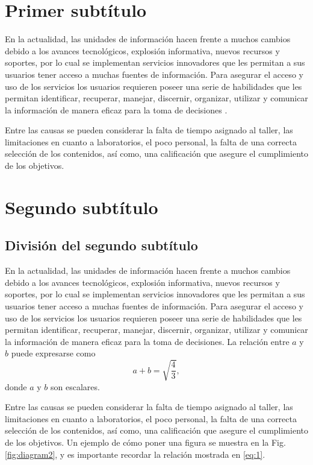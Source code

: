 \section{Primer subtítulo}

En la actualidad, las unidades de información hacen frente a muchos cambios
debido a los avances tecnológicos, explosión informativa, nuevos recursos y
soportes, por lo cual se implementan servicios innovadores que les permitan a
sus usuarios tener acceso a muchas fuentes de información. Para asegurar el
acceso y uso de los servicios los usuarios requieren poseer una serie de
habilidades que les permitan identificar, recuperar, manejar, discernir,
organizar, utilizar y comunicar la información de manera eficaz para la toma de
decisiones \cite{Reumann2012}.

Entre las causas se pueden considerar la falta de tiempo asignado al taller,
las limitaciones en cuanto a laboratorios, el poco personal, la falta de una
correcta selección de los contenidos, así como, una calificación que asegure el
cumplimiento de los objetivos.


\section{Segundo subtítulo}

\subsection{División del segundo subtítulo}

En la actualidad, las unidades de información hacen frente a muchos cambios
debido a los avances tecnológicos, explosión informativa, nuevos recursos y
soportes, por lo cual se implementan servicios innovadores que les permitan a
sus usuarios tener acceso a muchas fuentes de información. Para asegurar el
acceso y uso de los servicios los usuarios requieren poseer una serie de
habilidades que les permitan identificar, recuperar, manejar, discernir,
organizar, utilizar y comunicar la información de manera eficaz para la toma de
decisiones. La relación entre $a$ y $b$ puede expresarse como
%
\begin{equation}
  \label{eq:1}
  a+b=\sqrt{\frac{4}{3}},
\end{equation}
%
donde $a$ y $b$ son escalares.

Entre las causas se pueden considerar la falta de tiempo asignado al taller,
las limitaciones en cuanto a laboratorios, el poco personal, la falta de una
correcta selección de los contenidos, así como, una calificación que asegure el
cumplimiento de los objetivos. Un ejemplo de cómo poner una figura se muestra en la Fig. \ref{fig:diagram2}, y es importante recordar la relación mostrada en \eqref{eq:1}.


